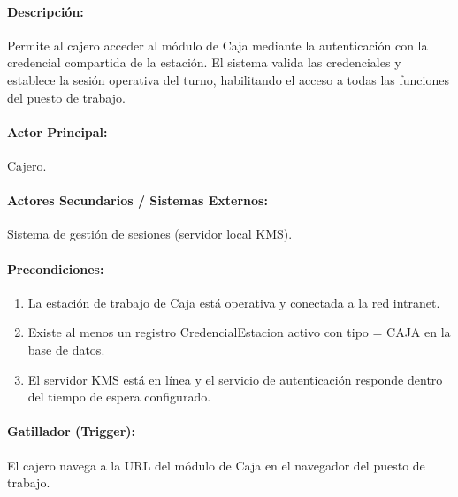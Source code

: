 \paragraph{Descripción:} Permite al cajero acceder al módulo de Caja mediante la autenticación con la credencial compartida de la estación. El sistema valida las credenciales y establece la sesión operativa del turno, habilitando el acceso a todas las funciones del puesto de trabajo.

\paragraph{Actor Principal:} Cajero.

\paragraph{Actores Secundarios / Sistemas Externos:} Sistema de gestión de sesiones (servidor local KMS).

\paragraph{Precondiciones:}
\begin{enumerate}
    \item[I.] La estación de trabajo de Caja está operativa y conectada a la red intranet.
    \item[II.] Existe al menos un registro CredencialEstacion activo con tipo = CAJA en la base de datos.
    \item[III.] El servidor KMS está en línea y el servicio de autenticación responde dentro del tiempo de espera configurado.
\end{enumerate}

\paragraph{Gatillador (Trigger):} El cajero navega a la URL del módulo de Caja en el navegador del puesto de trabajo.

